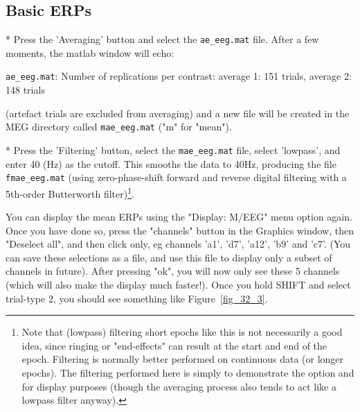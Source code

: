 \subsection{Basic ERPs}

* Press the 'Averaging' button and select the \verb!ae_eeg.mat! file. After a few moments, the matlab window will echo:

	\verb!ae_eeg.mat!: Number of replications per contrast:
	average 1: 151 trials, average 2: 148 trials

	(artefact trials are excluded from averaging) and a new file will be created in 	the MEG directory called \verb!mae_eeg.mat! ("m" for "mean").

* Press the 'Filtering' button, select the \verb!mae_eeg.mat! file, select 'lowpass', and enter 40 (Hz) as the cutoff. This smooths the data to 40Hz, producing the file \verb!fmae_eeg.mat! (using zero-phase-shift forward and reverse digital filtering with a 5th-order Butterworth filter)\footnote{Note that (lowpass) filtering short epochs like this is not necessarily a good idea, since ringing or "end-effects" can result at the start and end of the epoch. Filtering is normally better performed on continuous data (or longer epochs). The filtering performed here is simply to demonstrate the option and for display purposes (though the averaging process also tends to act like a lowpass filter anyway).}.

You can display the mean ERPs using the "Display: M/EEG" menu option again. Once you have done so, press the "channels" button in the Graphics window, then "Deselect all", and then click only, eg channels 'a1', 'd7', 'a12', 'b9' and 'c7'. (You can save these selections as a file, and use this file to display only a subset of channels in future). After pressing "ok", you will now only see these 5 channels (which will also make the display much faster!). Once you hold SHIFT and select trial-type 2, you should see something like Figure~\ref{fig_32_3}.

